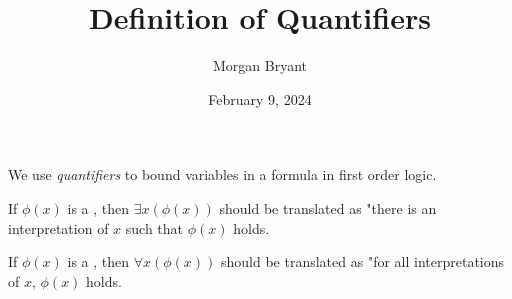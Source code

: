 \documentclass[a4paper]{article}
\title{Definition of Quantifiers}
\date{February 9, 2024}
\author{Morgan Bryant}
\begin{document}
\maketitle
\par{We use \emph{quantifiers} to bound variables in a formula in first order logic.}\par{If \(\phi (x)\) is a , then \(\exists  x ( \phi (x))\) should be translated as "there is an interpretation of \(x\) such that \(\phi (x)\) holds.}\par{If \(\phi (x)\) is a , then \(\forall  x ( \phi (x))\) should be translated as "for all interpretations of \(x\), \(\phi (x)\) holds.}
\printbibliography
\end{document}
